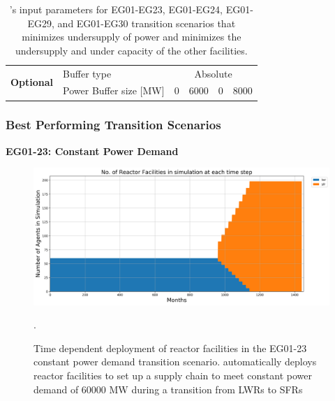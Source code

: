 \begin{frame}
\begin{table}[]
{\begin{tabular}{|l|l|c|l|l|l|}
        \multirow{2}{*}{\textbf{Optional}} & Buffer type                                                    & \multicolumn{4}{c|}{Absolute}                                                                                                                                                                                                                                                               \\ \cline{2-6} 
                                                  & Power Buffer size [MW]                                                   & 0 & 6000 & 0 & 8000 \\ \hline
        \end{tabular}%
        }
        \caption{\deploy's input parameters for EG01-EG23, EG01-EG24, EG01-EG29, and 
        EG01-EG30 transition scenarios
        that minimizes undersupply of power and minimizes 
        the undersupply and under capacity of the other facilities. }
        \label{tab:bestinputs}
        \end{table}
\end{frame}

\begin{frame}
    \frametitle{Best Performing Transition Scenarios}
    \textbf{EG01-23: Constant Power Demand}
    \begin{figure}[htbp!]
        \begin{center}
          \includegraphics[width=\textwidth]{images/eg23-stack_reactor.png}
        \end{center}
              \caption{Time dependent deployment of reactor facilities in 
              the EG01-23 constant power demand transition scenario. 
              \deploy automatically deploys reactor facilities 
              to set up a supply chain to meet constant power demand of $60000$ MW
              during a transition from \glspl{LWR} to \glspl{SFR}}.
      \end{figure}
\end{frame}

